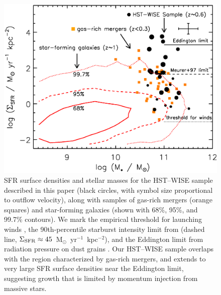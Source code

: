 \documentclass[apj]{emulateapj}
\newcommand{\units}{M$_{\odot}$~yr$^{-1}$~kpc$^{-2}$}
\newcommand{\sigmasfr}{\Sigma_{\textnormal{\scriptsize{SFR}}}}
\begin{document}
\begin{figure}[!t]
\begin{center}
\includegraphics[angle=0,scale=.8]{sigmasfr.ps} %
\caption{SFR surface densities and stellar masses for the HST--WISE
  sample described in this paper (black circles, with symbol size
  proportional to outflow velocity), along with samples of gas-rich
  mergers (orange squares) and star-forming galaxies (shown with 68\%,
  95\%, and 99.7\% contours).  We mark the empirical threshold for
  launching winds \citep[dotted line,
    $\sigmasfr\approx0.1$~\units;][]{hec02}, the 90th-percentile
  starburst intensity limit from \citet{meu97} (dashed line,
  $\sigmasfr\approx45$~\units), and the Eddington limit from radiation
  pressure on dust grains \citep[solid line,
    $\sigmasfr\approx2000$~\units;][]{mur05,tho05,hop10}.  Our
  HST--WISE sample overlaps with the region characterized by gas-rich
  mergers, and extends to very large SFR surface densities near the
  Eddington limit, suggesting growth that is limited by momentum
  injection from massive stars.}
\label{fig:sigmasfr}
\end{center}
\end{figure}

\end{document}
